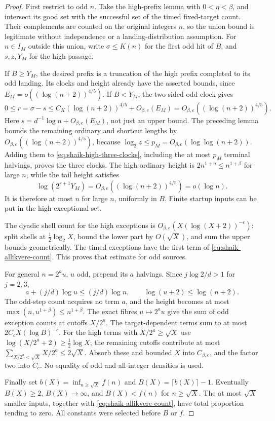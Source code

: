 \documentclass[11pt]{article}
\theoremstyle{remark}\newtheorem{remark}[proposition]{Remark}
\begin{document}
\begin{proof}
First restrict to odd \(n\). Take the high-prefix lemma with
\(0<\eta<\beta\), and intersect its good set with the successful
set of the timed fixed-target count. Their complements are counted
on the original integers \(n\), so the union bound is legitimate
without independence or a landing-distribution assumption.
For \(n\in I_M\) outside this union, write \(\sigma\le K(n)\)
for the first odd hit of \(B\), and \(s,z,Y_M\) for the high passage.

If \(B\ge Y_M\), the desired prefix is a truncation of the high
prefix completed to its odd landing. Its clocks and height already
have the asserted bounds, since
\(E_M=o((\log(n+2))^{4/5})\).
If \(B<Y_M\), the two-sided odd clock gives
\[
 0\le r=\sigma-s\le
 C_K(\log(n+2))^{4/5}+O_{\beta,e}(E_M)
       =O_{\beta,e}((\log(n+2))^{4/5}).
\]
Here \(s=d^{-1}\log n+O_{\beta,e}(E_M)\), not just an upper bound.
The preceding lemma bounds the remaining ordinary and shortcut
lengths by \(O_{\beta,e}((\log(n+2))^{4/5})\), because
\(\log_2z\le p_M=O_{\beta,e}(\log\log(n+2))\).
Adding them to \eqref{eq:shaik-high-three-clocks}, including the
at most \(p_M\) terminal halvings, proves the three clocks.
The high ordinary height is \(2n^{1+\eta}\le n^{1+\beta}\) for
large \(n\), while the tail height satisfies
\[
 \log(2^{r+1}Y_M)
      =O_{\beta,e}((\log(n+2))^{4/5})=o(\log n).
\]
It is therefore at most \(n\) for large \(n\), uniformly in \(B\).
Finite startup inputs can be put in the high exceptional set.

The dyadic shell count for the high exceptions is
\(O_{\beta,e}(X(\log(X+2))^{-e})\): split shells at
\(\tfrac12\log_2X\), bound the lower part by \(O(\sqrt X)\),
and sum the upper bounds geometrically. The timed exceptions have
the first term of \eqref{eq:shaik-allikvere-count}.
This proves that estimate for odd sources.

For general \(n=2^a u\), \(u\) odd, prepend its \(a\) halvings.
Since \(j\log2/d>1\) for \(j=2,3\),
\[
 a+(j/d)\log u\le(j/d)\log n,\qquad
 \log(u+2)\le\log(n+2).
\]
The odd-step count acquires no term \(a\), and the height becomes
at most \(\max(n,u^{1+\beta})\le n^{1+\beta}\).
The exact fibres \(u\mapsto2^au\) give the sum of odd exception
counts at cutoffs \(X/2^a\).
The target-dependent terms sum to at most
\(2C_cX(\log B)^{-c}\). For the high terms with \(X/2^a\ge\sqrt X\)
use \(\log(X/2^a+2)\ge\tfrac12\log X\); the remaining cutoffs
contribute at most \(\sum_{X/2^a<\sqrt X}X/2^a\le2\sqrt X\).
Absorb these and bounded \(X\) into \(C_{\beta,e}\), and the factor
two into \(C_c\). No equality of odd and all-integer densities is used.

Finally set \(b(X)=\inf_{n\ge\sqrt X}f(n)\) and
\(B(X)=\lceil b(X)\rceil-1\). Eventually \(B(X)\ge2\),
\(B(X)\to\infty\), and \(B(X)<f(n)\) for \(n\ge\sqrt X\).
The at most \(\sqrt X\) smaller inputs, together with
\eqref{eq:shaik-allikvere-count}, have total proportion tending to
zero. All constants were selected before \(B\) or \(f\).
\end{proof}
\end{document}
